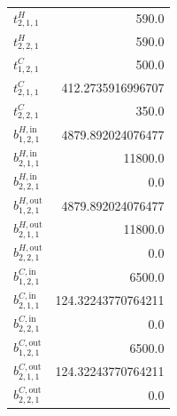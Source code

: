 \documentclass{article}%
\begin{document}
\begin{multicols*}{3}
\begin{supertabular}{lr}
	$t_{2,1,1}^{H}$ & 590.0 \\%
	$t_{2,2,1}^{H}$ & 590.0 \\%
	$t_{1,2,1}^{C}$ & 500.0 \\%
	$t_{2,1,1}^{C}$ & 412.2735916996707 \\%
	$t_{2,2,1}^{C}$ & 350.0 \\%
	$b_{1,2,1}^{H,\text{in}}$ & 4879.892024076477 \\%
	$b_{2,1,1}^{H,\text{in}}$ & 11800.0 \\%
	$b_{2,2,1}^{H,\text{in}}$ & 0.0 \\%
	$b_{1,2,1}^{H,\text{out}}$ & 4879.892024076477 \\%
	$b_{2,1,1}^{H,\text{out}}$ & 11800.0 \\%
	$b_{2,2,1}^{H,\text{out}}$ & 0.0 \\%
	$b_{1,2,1}^{C,\text{in}}$ & 6500.0 \\%
	$b_{2,1,1}^{C,\text{in}}$ & 124.32243770764211 \\%
	$b_{2,2,1}^{C,\text{in}}$ & 0.0 \\%
	$b_{1,2,1}^{C,\text{out}}$ & 6500.0 \\%
	$b_{2,1,1}^{C,\text{out}}$ & 124.32243770764211 \\%
	$b_{2,2,1}^{C,\text{out}}$ & 0.0 \\%
\end{supertabular}%
\end{multicols*}%
\end{document}
